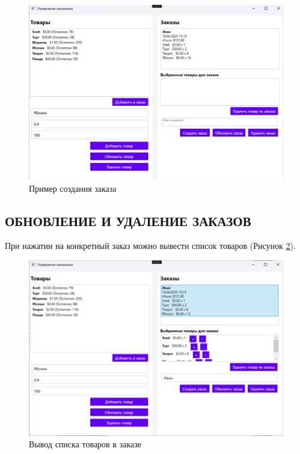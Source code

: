 \documentclass[12pt]{article}
\numberwithin{listing}{section}
\numberwithin{figure}{section}
\begin{document}
\begin{figure}[ht]
	\centering
	\includegraphics[width=1.0\textwidth]{fig/image 62.png}
	\caption{Пример создания заказа} %
	\label{fig:demo5}
\end{figure}

\pagebreak

\subsection{ОБНОВЛЕНИЕ И УДАЛЕНИЕ ЗАКАЗОВ}

При нажатии на конкретный заказ можно вывести список товаров (Рисунок \ref{fig:demo6}).

\begin{figure}[ht]
	\centering
	\includegraphics[width=1.0\textwidth]{fig/image 63.png}
	\caption{Вывод списка товаров в заказе}
	\label{fig:demo6}
\end{figure}
\end{document}
